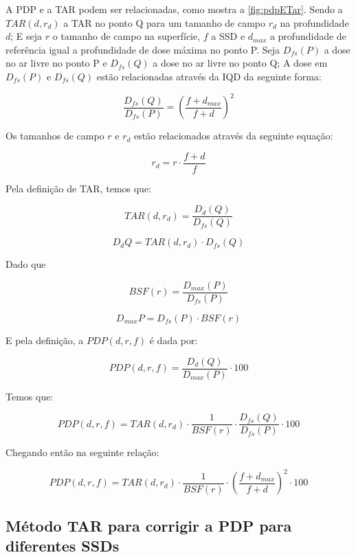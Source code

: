 \documentclass[11pt,a4paper]{article}
\begin{document}
	A PDP e a TAR podem ser relacionadas, como mostra a \ref{fig:pdpETar}. Sendo a $TAR(d, r_d)$ a TAR no ponto Q para um tamanho de campo $r_d$ na profundidade $d$; E seja $r$ o tamanho de campo na superfície, $f$ a SSD e $d_{max}$ a profundidade de referência igual a profundidade de dose máxima no ponto P. Seja $D_{fs}(P)$ a dose no ar livre no ponto P e $D_{fs}(Q)$ a dose no ar livre no ponto Q; A dose em $D_{fs}(P)$ e $D_{fs}(Q)$ estão relacionadas através da IQD da seguinte forma:

		\begin{equation}
			\frac{D_{fs}(Q)}{D_{fs}(P)} = \left(\frac{f + d_{max}}{f + d}\right)^2
		\end{equation}

	Os tamanhos de campo $r$ e $r_d$ estão relacionados através da seguinte equação:

		\begin{equation}
			r_d = r \cdot \frac{f + d}{f}
		\end{equation}

	Pela definição de TAR, temos que:

		$$TAR(d, r_d) = \frac{D_d(Q)}{D_{fs}(Q)}$$

	\begin{equation}
		D_d{Q} = TAR(d, r_d) \cdot D_{fs}(Q)
	\end{equation}

	Dado que 

		$$BSF(r) = \frac{D_{max}(P)}{D_{fs}(P)}$$

		$$D_{max}{P} = D_{fs}(P) \cdot BSF(r)$$

	E pela definição, a $PDP(d, r, f)$ é dada por:

		$$PDP(d, r, f) = \frac{D_d(Q)}{D_{max}(P)} \cdot 100$$

	Temos que:

		$$PDP(d, r, f) = TAR(d, r_d) \cdot \frac{1}{BSF(r)} \cdot \frac{D_{fs}(Q)}{D_{fs}(P)} \cdot 100$$

	Chegando então na seguinte relação:

	\begin{equation}
		PDP(d, r, f) = TAR(d, r_d) \cdot \frac{1}{BSF(r)} \cdot \left(\frac{f + d_{max}}{f + d}\right)^2 \cdot 100
		\label{eq:tarParaPdp}
	\end{equation}

	\subsection*{Método TAR para corrigir a PDP para diferentes SSDs}
\end{document}
